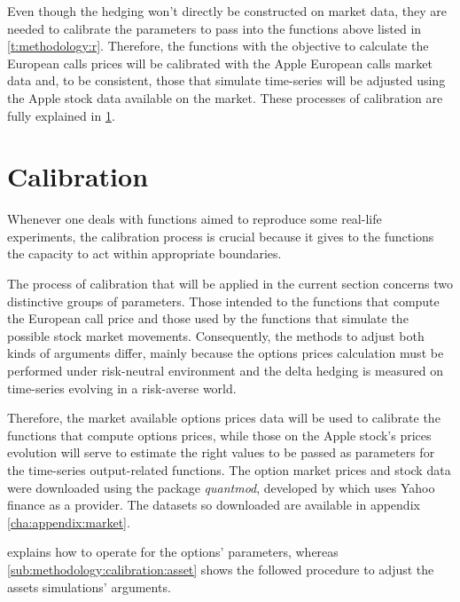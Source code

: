 \documentclass[12pt]{report}
\begin{document}
Even though the hedging won't directly be constructed on market data, they are needed to calibrate the parameters to pass into the functions above listed in \cref{t:methodology:r}.
Therefore, the functions with the objective to calculate the European calls prices will be calibrated with the Apple European calls market data and, to be consistent, those that simulate time-series will be adjusted using the Apple stock data available on the market.
These processes of calibration are fully explained in \cref{sec:methodology:calibration}.


\section{Calibration}
\label{sec:methodology:calibration}

Whenever one deals with functions aimed to reproduce some real-life experiments, the calibration process is crucial because it gives to the functions the capacity to act within appropriate boundaries.

The process of calibration that will be applied in the current section concerns two distinctive groups of parameters. 
Those intended to the functions that compute the European call price and those used by the functions that simulate the possible stock market movements.
Consequently, the methods to adjust both kinds of arguments differ, mainly because the options prices calculation must be performed under risk-neutral environment and the delta hedging is measured on time-series evolving in a risk-averse world.

Therefore, the market available options prices data will be used to calibrate the functions that compute options prices, while those on the Apple stock's prices evolution will serve to estimate the right values to be passed as parameters for the time-series output-related functions.
The option market prices and stock data were downloaded using the package \textit{quantmod}, developed by \citet{quantmod} which uses Yahoo finance as a provider. The datasets so downloaded are available in appendix \ref{cha:appendix:market}.

 explains how to operate for the options' parameters, whereas \cref{sub:methodology:calibration:asset} shows the followed procedure to adjust the assets simulations' arguments.
\end{document}
